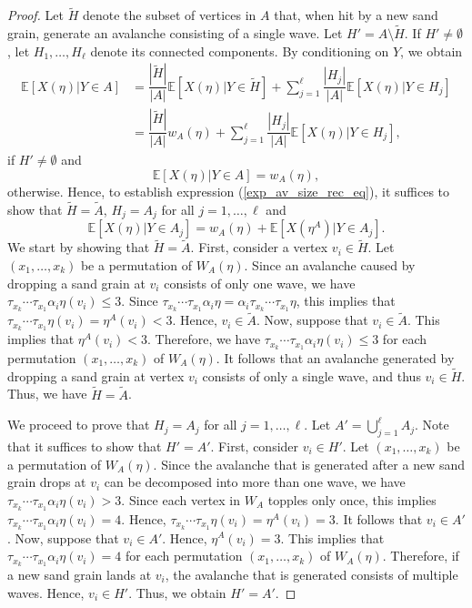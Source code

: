 \documentclass[10pt,a4paper]{amsart}
\begin{document}
\begin{proof}
    Let $\tilde{H}$ denote the subset of vertices in $A$ that, when hit by a new sand grain, generate an avalanche consisting of a single wave. Let $H' = A \setminus \tilde{H}$. If $H' \neq \emptyset$, let $H_1, \ldots, H_{\ell}$ denote its connected components. By conditioning on $Y$, we obtain
    \begin{align*}
        \mathbb{E}[X(\eta)|Y \in A] &= \dfrac{|\tilde{H}|}{|A|} \mathbb{E}[X(\eta)|Y \in \tilde{H}]  + \sum\limits_{j=1}^{\ell} \dfrac{|H_j|}{|A|} \mathbb{E}[X(\eta)|Y \in H_j] \\
        &= \dfrac{|\tilde{H}|}{|A|} w_A(\eta) + \sum\limits_{j=1}^{\ell} \dfrac{|H_j|}{|A|}\mathbb{E}[X(\eta)|Y \in H_j],
    \end{align*}
    if $H' \neq \emptyset$ and
    \begin{equation*}
        \mathbb{E}[X(\eta)|Y \in A] = w_A(\eta),
    \end{equation*}
    otherwise. Hence, to establish expression (\ref{exp_av_size_rec_eq}), it suffices to show that $\tilde{H} = \tilde{A}$, $H_j = A_j$ for all $j = 1, \ldots, \ell$ and
    \begin{equation}\label{exp_av_size_rec_help}
        \mathbb{E}[X(\eta)|Y \in A_j] = w_A(\eta) + \mathbb{E}[X(\eta^A)|Y \in A_j].
    \end{equation}
    We start by showing that $\tilde{H} = \tilde{A}$. First, consider a vertex $v_i \in \tilde{H}$. Let $(x_1, \ldots, x_k)$ be a permutation of $W_A(\eta)$. Since an avalanche caused by dropping a sand grain at $v_i$ consists of only one wave, we have $\tau_{x_k} \cdots \tau_{x_1} \alpha_i \eta(v_i) \leq 3$. Since $\tau_{x_k} \cdots \tau_{x_1} \alpha_i \eta = \alpha_i \tau_{x_k} \cdots \tau_{x_1} \eta$, this implies that $\tau_{x_k} \cdots \tau_{x_1} \eta(v_i) = \eta^A(v_i) < 3$. Hence, $v_i \in \tilde{A}$. Now, suppose that $v_i \in \tilde{A}$. This implies that $\eta^A(v_i) < 3$. Therefore, we have $\tau_{x_k} \cdots \tau_{x_1} \alpha_i \eta(v_i) \leq 3$ for each permutation $(x_1, \ldots, x_k)$ of $W_A(\eta)$. It follows that an avalanche generated by dropping a sand grain at vertex $v_i$ consists of only a single wave, and thus $v_i \in \tilde{H}$. Thus, we have $\tilde{H} = \tilde{A}$.

    We proceed to prove that $H_j = A_j$ for all $j = 1, \ldots, \ell$. Let $A' = \bigcup_{j = 1}^{\ell} A_j$. Note that it suffices to show that $H' = A'$. First, consider $v_i \in H'$. Let $(x_1, \ldots, x_k)$ be a permutation of $W_A(\eta)$. Since the avalanche that is generated after a new sand grain drops at $v_i$ can be decomposed into more than one wave, we have $\tau_{x_k} \cdots \tau_{x_1} \alpha_i \eta(v_i) > 3$. Since each vertex in $W_A$ topples only once, this implies $\tau_{x_k} \cdots \tau_{x_1} \alpha_i \eta (v_i) = 4$. Hence, $\tau_{x_k} \cdots \tau_{x_1} \eta(v_i) = \eta^A(v_i) = 3$. It follows that $v_i \in A'$. Now, suppose that $v_i \in A'$. Hence, $\eta^A(v_i) = 3$. This implies that $\tau_{x_k} \cdots \tau_{x_1} \alpha_i \eta (v_i) = 4$ for each permutation $(x_1, \ldots, x_k)$ of $W_A(\eta)$. Therefore, if a new sand grain lands at $v_i$, the avalanche that is generated consists of multiple waves. Hence, $v_i \in H'$. Thus, we obtain $H' = A'$. 


\end{proof}
\end{document}
